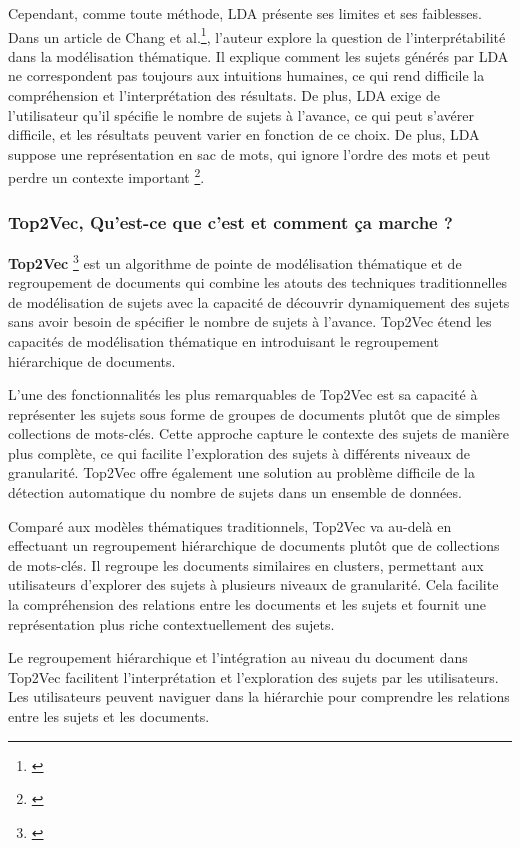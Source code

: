 Cependant, comme toute méthode, LDA présente ses limites et ses faiblesses. Dans un article de Chang et al.\footnote{\cite{NIPS2009_f92586a2}},  l'auteur explore la question de l'interprétabilité dans la modélisation thématique. Il explique comment les sujets générés par LDA ne correspondent pas toujours aux intuitions humaines, ce qui rend difficile la compréhension et l'interprétation des résultats. De plus, LDA exige de l'utilisateur qu'il spécifie le nombre de sujets à l'avance, ce qui peut s'avérer difficile, et les résultats peuvent varier en fonction de ce choix. De plus, LDA suppose une représentation en sac de mots, qui ignore l'ordre des mots et peut perdre un contexte important \footnote{\cite{10.4108/eai.13-7-2018.159623}}.

\subsubsection{Top2Vec, Qu'est-ce que c'est et comment ça marche ?}

\textbf{Top2Vec} \footnote{\cite{angelov2020top2vec}} est un algorithme de pointe de modélisation thématique et de regroupement de documents qui combine les atouts des techniques traditionnelles de modélisation de sujets avec la capacité de découvrir dynamiquement des sujets sans avoir besoin de spécifier le nombre de sujets à l'avance. Top2Vec étend les capacités de modélisation thématique en introduisant le regroupement hiérarchique de documents.

L'une des fonctionnalités les plus remarquables de Top2Vec est sa capacité à représenter les sujets sous forme de groupes de documents plutôt que de simples collections de mots-clés. Cette approche capture le contexte des sujets de manière plus complète, ce qui facilite l'exploration des sujets à différents niveaux de granularité. Top2Vec offre également une solution au problème difficile de la détection automatique du nombre de sujets dans un ensemble de données.

Comparé aux modèles thématiques traditionnels, Top2Vec va au-delà en effectuant un regroupement hiérarchique de documents plutôt que de collections de mots-clés. Il regroupe les documents similaires en clusters, permettant aux utilisateurs d'explorer des sujets à plusieurs niveaux de granularité. Cela facilite la compréhension des relations entre les documents et les sujets et fournit une représentation plus riche contextuellement des sujets.

Le regroupement hiérarchique et l'intégration au niveau du document dans Top2Vec facilitent l'interprétation et l'exploration des sujets par les utilisateurs. Les utilisateurs peuvent naviguer dans la hiérarchie pour comprendre les relations entre les sujets et les documents.

